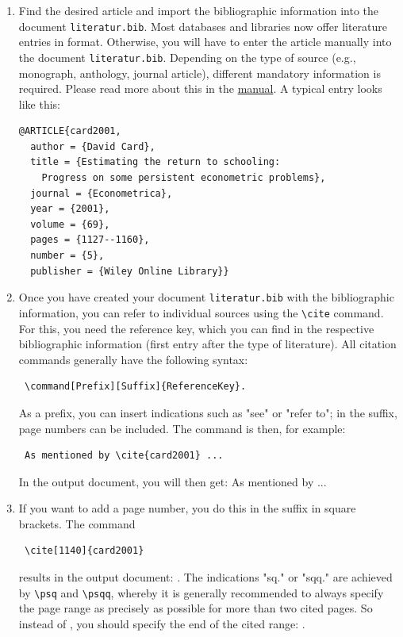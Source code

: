 \begin{enumerate}
\item Find the desired article and import the bibliographic information into the document \texttt{literatur.bib}. Most databases and libraries now offer literature entries in  format. Otherwise, you will have to enter the article manually into the document \texttt{literatur.bib}. Depending on the type of source (e.g., monograph, anthology, journal article), different mandatory information is required. Please read more about this in the \href{https://texdoc.org/pkg/biblatex}{\color{blue}manual}. A typical entry looks like this:
\begin{verbatim}
@ARTICLE{card2001,
  author = {David Card},
  title = {Estimating the return to schooling: 
	Progress on some persistent econometric problems},
  journal = {Econometrica},
  year = {2001},
  volume = {69},
  pages = {1127--1160},
  number = {5},
  publisher = {Wiley Online Library}}
\end{verbatim}

\item Once you have created your document \texttt{literatur.bib} with the bibliographic information, you can refer to individual sources using the \verb|\cite| command. For this, you need the reference key, which you can find in the respective bibliographic information (first entry after the type of literature). All citation commands generally have the following syntax: \begin{verbatim} \command[Prefix][Suffix]{ReferenceKey}.\end{verbatim} As a prefix, you can insert indications such as "see" or "refer to"; in the suffix, page numbers can be included. The command is then, for example: \begin{verbatim} As mentioned by \cite{card2001} ...  \end{verbatim} In the output document, you will then get: As mentioned by \cite{card2001} ...\\

\item If you want to add a page number, you do this in the suffix in square brackets. The command \begin{verbatim} \cite[1140]{card2001} \end{verbatim} results in the output document: \cite[1140]{card2001}. The indications "sq." or "sqq." are achieved by \verb|\psq| and \verb|\psqq|, whereby it is generally recommended to always specify the page range as precisely as possible for more than two cited pages. So instead of \cite[1140 \psqq]{card2001}, you should specify the end of the cited range: \cite[1140-1143]{card2001}.\\


\end{enumerate}
